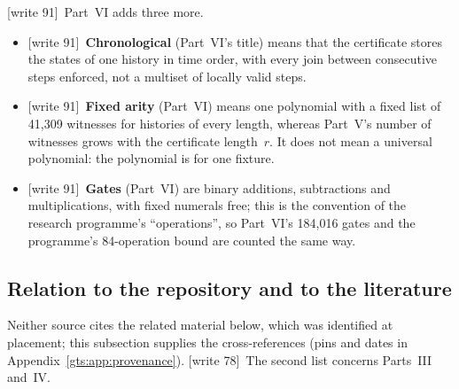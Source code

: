 \documentclass[11pt,letterpaper]{article}
\theoremstyle{definition}
\theoremstyle{remark}
\newcommand{\wtagb}{\textup{[write 78]}}
\newcommand{\wtagd}{\textup{[write 91]}}
\begin{document}
\wtagd\ Part~VI adds three more.
\begin{itemize}
\item \wtagd\ \textbf{Chronological} (Part~VI's title) means that the certificate stores the states of one history in time order, with every join between consecutive steps enforced, not a multiset of locally valid steps.
\item \wtagd\ \textbf{Fixed arity} (Part~VI) means one polynomial with a fixed list of 41,309 witnesses for histories of every length, whereas Part~V's number of witnesses grows with the certificate length~$r$. It does not mean a universal polynomial: the polynomial is for one fixture.
\item \wtagd\ \textbf{Gates} (Part~VI) are binary additions, subtractions and multiplications, with fixed numerals free; this is the convention of the research programme's ``operations'', so Part~VI's 184,016 gates and the programme's 84-operation bound are counted the same way.
\end{itemize}

\subsection{Relation to the repository and to the literature}\label{gts:sec:relation}

Neither source cites the related material below, which was identified at placement; this subsection supplies the cross-references (pins and dates in Appendix~\ref{gts:app:provenance}). \wtagb\ The second list concerns Parts~III and~IV.
\end{document}
